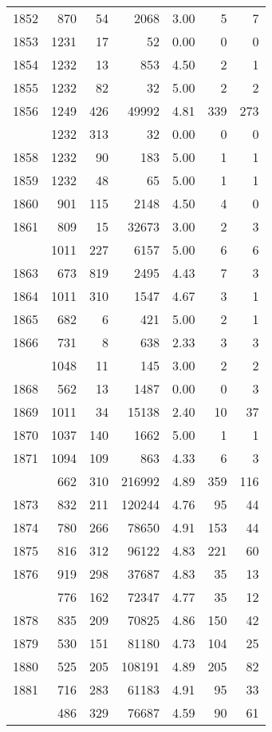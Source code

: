\documentclass[
]{article}
\begin{document}
\begin{table}
\begin{tabular}[t]{lrrrrrr}
1852 & 870 & 54 & 2068 & 3.00 & 5 & 7\\
1853 & 1231 & 17 & 52 & 0.00 & 0 & 0\\
1854 & 1232 & 13 & 853 & 4.50 & 2 & 1\\
1855 & 1232 & 82 & 32 & 5.00 & 2 & 2\\
1856 & 1249 & 426 & 49992 & 4.81 & 339 & 273\\
\addlinespace
1857 & 1232 & 313 & 32 & 0.00 & 0 & 0\\
1858 & 1232 & 90 & 183 & 5.00 & 1 & 1\\
1859 & 1232 & 48 & 65 & 5.00 & 1 & 1\\
1860 & 901 & 115 & 2148 & 4.50 & 4 & 0\\
1861 & 809 & 15 & 32673 & 3.00 & 2 & 3\\
\addlinespace
1862 & 1011 & 227 & 6157 & 5.00 & 6 & 6\\
1863 & 673 & 819 & 2495 & 4.43 & 7 & 3\\
1864 & 1011 & 310 & 1547 & 4.67 & 3 & 1\\
1865 & 682 & 6 & 421 & 5.00 & 2 & 1\\
1866 & 731 & 8 & 638 & 2.33 & 3 & 3\\
\addlinespace
1867 & 1048 & 11 & 145 & 3.00 & 2 & 2\\
1868 & 562 & 13 & 1487 & 0.00 & 0 & 3\\
1869 & 1011 & 34 & 15138 & 2.40 & 10 & 37\\
1870 & 1037 & 140 & 1662 & 5.00 & 1 & 1\\
1871 & 1094 & 109 & 863 & 4.33 & 6 & 3\\
\addlinespace
1872 & 662 & 310 & 216992 & 4.89 & 359 & 116\\
1873 & 832 & 211 & 120244 & 4.76 & 95 & 44\\
1874 & 780 & 266 & 78650 & 4.91 & 153 & 44\\
1875 & 816 & 312 & 96122 & 4.83 & 221 & 60\\
1876 & 919 & 298 & 37687 & 4.83 & 35 & 13\\
\addlinespace
1877 & 776 & 162 & 72347 & 4.77 & 35 & 12\\
1878 & 835 & 209 & 70825 & 4.86 & 150 & 42\\
1879 & 530 & 151 & 81180 & 4.73 & 104 & 25\\
1880 & 525 & 205 & 108191 & 4.89 & 205 & 82\\
1881 & 716 & 283 & 61183 & 4.91 & 95 & 33\\
\addlinespace
1882 & 486 & 329 & 76687 & 4.59 & 90 & 61\\

\end{tabular}
\end{table}
\end{document}
